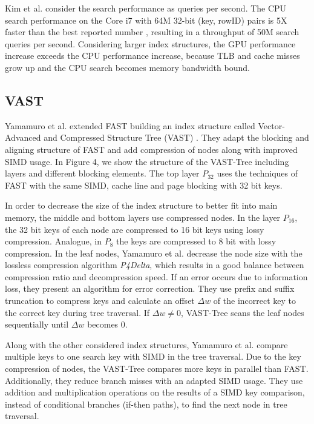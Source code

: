 \documentclass[runningheads,a4paper]{llncs}
\begin{document}
Kim et al. consider the search performance as queries per second. The CPU search performance on the Core i7 with 64M 32-bit (key, rowID) pairs is 5X faster than the best reported number \cite{schlegel2009k}, resulting in a throughput of 50M search queries per second. Considering larger index structures, the GPU performance increase exceeds the CPU performance increase, because TLB and cache misses grow up and the CPU search becomes memory bandwidth bound.

\subsection{VAST}\label{SCM}
Yamamuro et al. extended FAST building an index structure called Vector-Advanced and Compressed Structure Tree (VAST) \cite{yamamuro2012vast}. They adapt the blocking and aligning structure of FAST and add compression of nodes along with improved SIMD usage. In Figure 4, we show the structure of the VAST-Tree including layers and different blocking elements. The top layer $P_{32}$ uses the techniques of FAST with the same SIMD, cache line and page blocking with 32 bit keys.

In order to decrease the size of the index structure to better fit into main memory, the middle and bottom layers use compressed nodes. In the layer $P_{16}$, the 32 bit keys of each node are compressed to 16 bit keys using lossy compression. Analogue, in $P_8$ the keys are compressed to 8 bit with lossy compression. In the leaf nodes, Yamamuro et al. decrease the node size with the lossless compression algorithm \emph{P4Delta}, which results in a good balance between compression ratio and decompression speed. If an error occurs due to information loss, they present an algorithm for error correction. They use prefix and suffix truncation to compress keys and calculate an offset $\Delta w$ of the incorrect key to the correct key during tree traversal. If $\Delta w\neq0$, VAST-Tree scans the leaf nodes sequentially until $\Delta w$ becomes $0$.

Along with the other considered index structures, Yamamuro et al. compare multiple keys to one search key with SIMD in the tree traversal. Due to the key compression of nodes, the VAST-Tree compares more keys in parallel than FAST. Additionally, they reduce branch misses with an adapted SIMD usage. They use addition and multiplication operations on the results of a SIMD key comparison, instead of conditional branches (if-then paths), to find the next node in tree traversal.
\end{document}
